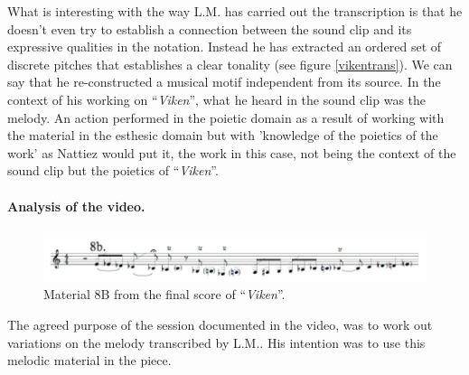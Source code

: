 \documentclass[10pt,letterpaper]{article}
\begin{document}
What is interesting with the way L.M. has carried out the transcription
is that he doesn't even try to establish a connection between the sound
clip and its expressive qualities in the notation. Instead he has
extracted an ordered set of discrete pitches that establishes a clear
tonality (see figure \ref{vikentrans}). We can
say that he re-constructed a musical motif independent from its
source. In the context of his working on ``\emph{Viken}'', what he heard in
the sound clip was the melody. An action performed in the poietic domain
as a result of working with the material in the esthesic domain but with
'knowledge of the poietics of the work' as Nattiez would put it, the
work in this case, not being the context of the sound clip but the
poietics of ``\emph{Viken}''.

\paragraph{Analysis of the video.} \label{thevideo}

\begin{figure}[!hbp]
\includegraphics[width=1.0\columnwidth]{img/viken8b}
\caption{Material 8B from the final score of ``\emph{Viken}''.}
\label{viken8}
\end{figure}

The agreed purpose of the session documented in the video, was to work
out variations on the melody transcribed by L.M.. His intention was
to use this melodic material in the piece.
\end{document}
